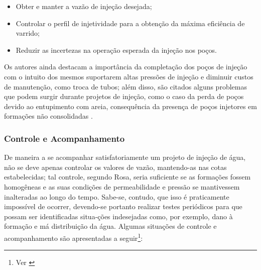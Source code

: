 \begin{itemize}
	\item Obter e manter a vaz\~{a}o de inje\c{c}\~{a}o desejada;
	\item Controlar o perfil de injetividade para a obten\c{c}\~{a}o da m\'{a}xima efici\^{e}ncia de varrido;
	\item Reduzir as incertezas na opera\c{c}\~{a}o esperada da inje\c{c}\~{a}o nos po\c{c}os.
\end{itemize}

Os autores ainda destacam a import\^{a}ncia da completa\c{c}\~{a}o dos po\c{c}os de inje\c{c}\~{a}o com o intuito dos mesmos suportarem altas press\~{o}es de inje\c{c}\~{a}o e diminuir custos de manuten\c{c}\~{a}o, como troca de tubos; al\'{e}m disso, s\~{a}o citados alguns problemas que podem surgir durante projetos de inje\c{c}\~{a}o, como o caso da perda de po\c{c}os devido ao entupimento com areia, consequ\^{e}ncia da presen\c{c}a de po\c{c}os injetores em forma\c{c}\~{o}es n\~{a}o consolidadas \cite{PALSSON2003333}. 

\subsubsection{Controle e Acompanhamento}
De maneira a se acompanhar satisfatoriamente um projeto de inje\c{c}\~{a}o de \'{a}gua, n\~{a}o se deve apenas controlar os valores de vaz\~{a}o, mantendo-as nas cotas estabelecidas; tal controle, segundo Rosa, seria suficiente se as forma\c{c}\~{o}es fossem homog\^{e}neas e as suas condi\c{c}\~{o}es de permeabilidade e press\~{a}o se mantivessem inalteradas ao longo do tempo. Sabe-se, contudo, que isso \'{e} praticamente imposs\'{i}vel de ocorrer, devendo-se portanto realizar testes peri\'{o}dicos para que possam ser identificadas situa-\c{c}\~{o}es indesejadas como, por exemplo, dano \`{a} forma\c{c}\~{a}o e m\'{a} distribui\c{c}\~{a}o da \'{a}gua. Algumas situa\c{c}\~{o}es de controle e acompanhamento s\~{a}o apresentadas a seguir\footnote{Ver \cite[pp. 659-662]{engres}}:

